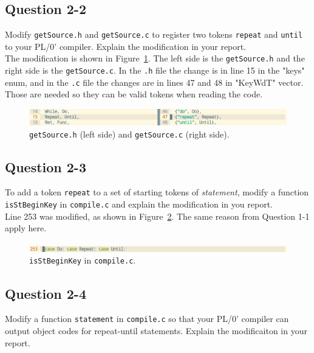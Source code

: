 \documentclass{article}
\begin{document}
\subsection*{Question 2-2}
Modify {\tt getSource.h} and {\tt getSource.c} to register two tokens
{\tt repeat} and {\tt until} to your PL/0' compiler.
Explain the modification in your report.\\[0.3cm]


\ifreport
The modification is shown in Figure~\ref{fig:q22}. The left side is the {\tt getSource.h} and the right side is the {\tt getSource.c}. In the {\tt .h} file the change is in line 15 in the "keys" enum, and in the {\tt .c} file the changes are in lines 47 and 48 in "KeyWdT" vector. Those are needed so they can be valid tokens when reading the code.\\
\begin{figure}[h]
  \includegraphics[scale=0.35]{./img/Q2-2.png}
  \centering
  \caption{{\tt getSource.h} (left side) and {\tt getSource.c} (right side).}
  \label{fig:q22}
\end{figure}
\fi




\subsection*{Question 2-3}
To add a token {\tt repeat} to a set of starting tokens of {\it statement},
modify a function {\tt isStBeginKey} in {\tt compile.c} and explain the modification in you report.\\[0.3cm]


\ifreport
Line 253 was modified, as shown in Figure~\ref{fig:q23}. The same reason from Question 1-1 apply here.
\begin{figure}[h]
  \includegraphics[scale=0.35]{./img/Q2-3.png}
  \centering
  \caption{{\tt isStBeginKey} in {\tt compile.c}.}
  \label{fig:q23}
\end{figure}
\fi


\subsection*{Question 2-4}
Modify a function {\tt statement} in {\tt compile.c}
so that your PL/0' compiler can output object codes for repeat-until statements.
Explain the modificaiton in your report.
\end{document}
